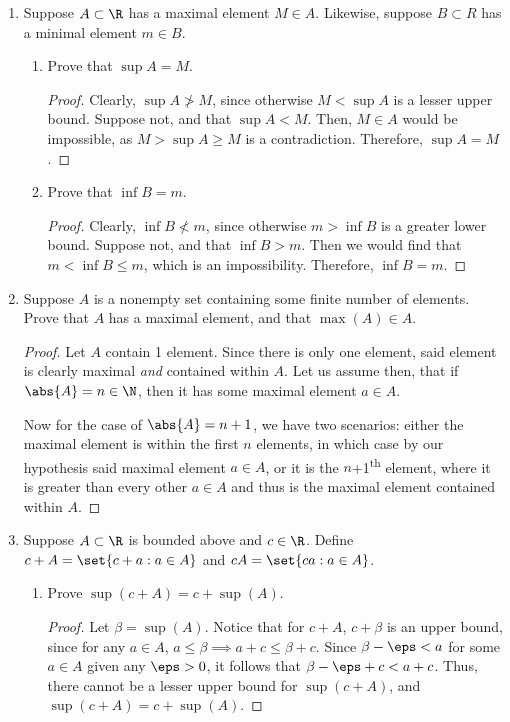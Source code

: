 \documentclass{article}
\begin{document}
\begin{enumerate}
  \item Suppose $A \subset \R$ has a maximal element $M \in A$. Likewise, suppose $B \subset R$
        has a minimal element $m \in B$.
        \begin{enumerate}
          \item Prove that $\sup A = M$.
                \begin{proof}
                  Clearly, $\sup A \not > M$, since otherwise $M < \sup A$ is a lesser upper bound.
                  Suppose not, and that $\sup A < M$. Then, $M \in A$ would be impossible, as $M > \sup A \ge M$ is a contradiction.
                  Therefore, $\sup A = M$.
                \end{proof}
          \item Prove that $\inf B = m$.
                \begin{proof}
                  Clearly, $\inf B \not < m$, since otherwise $m > \inf B$ is a greater lower bound.
                  Suppose not, and that $\inf B > m$. Then we would find that $m < \inf B \le m$, which is an impossibility.
                  Therefore, $\inf B = m$.
                \end{proof}
        \end{enumerate}

  \item Suppose $A$ is a nonempty set containing some finite number of elements. Prove that $A$ has a maximal element,
        and that $\max(A) \in A$.
        \begin{proof}
          Let $A$ contain 1 element. Since there is only one element, said element is clearly maximal \textit{and} contained
          within $A$. Let us assume then, that if $\abs{A} = n \in \N$, then it has some maximal element $a \in A$.

          Now for the case of $\abs{A} = n + 1$, we have two scenarios: either the maximal element is within the first $n$
          elements, in which case by our hypothesis said maximal element $a \in A$, or it is the $n$+1\textsuperscript{th} element, where
          it is greater than every other $a \in A$ and thus is the maximal element contained within $A$.
        \end{proof}

  \item Suppose $A \subset \R$ is bounded above and $c \in \R$. Define $c + A = \set{c + a : a \in A}$
        and $cA = \set{ca : a \in A}$.
        \begin{enumerate}
          \item Prove $\sup(c + A) = c + \sup(A)$.
                \begin{proof}
                  Let $\beta = \sup(A)$. Notice that for $c + A$, $c + \beta$ is an upper bound, since
                  for any $a \in A$, $a \le \beta \implies a + c \le \beta + c$.
                  Since $\beta - \eps < a$ for some $a \in A$ given any $\eps > 0$,
                  it follows that $\beta - \eps + c < a + c$. Thus, there cannot be a lesser upper bound
                  for $\sup(c + A)$, and $\sup(c + A) = c + \sup(A)$.
                \end{proof}


\end{enumerate}
\end{enumerate}
\end{document}
